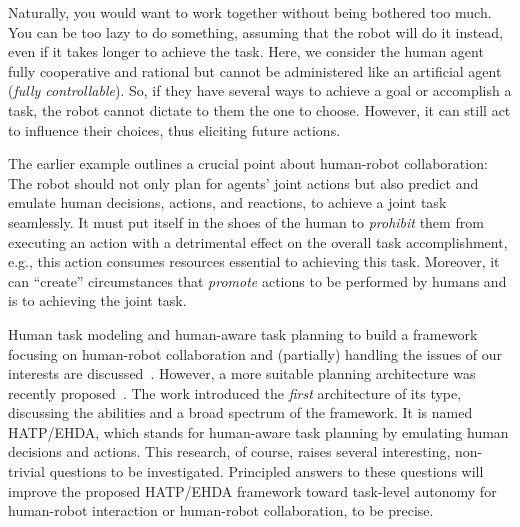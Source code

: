 \documentclass[letterpaper]{article} %
\begin{document}
Naturally, you would want to work together without being bothered too much. You can be too lazy to do something, assuming that the robot will do it instead, even if it takes longer to achieve the task. Here, we consider the human agent fully cooperative and rational but cannot be administered like an artificial agent (\textit{fully controllable}). 
So, if they have several ways to achieve a goal or accomplish a task, the robot cannot dictate to them the one to choose. However, it can still act to influence their choices, thus eliciting future actions. 

The earlier example outlines a crucial point about human-robot collaboration: The robot should not only plan for agents' joint actions but also predict and emulate human decisions, actions, and reactions, to achieve a joint task seamlessly. It must put itself in the shoes of the human to \textit{prohibit} them from executing an action with a detrimental effect on the overall task accomplishment, e.g., this action consumes resources essential to achieving this task. Moreover, it can ``create'' circumstances that \textit{promote} actions to be performed by humans and is  to achieving the joint task.                 


Human task modeling and human-aware task planning to build a framework focusing on human-robot collaboration and (partially) handling the issues of our interests are discussed~\cite{alami2006toward,montreuil2007planning,alili2009planning,alili2009task,lallement2014hatp,de2015hatp,lallement2018hatp}.
However, a more suitable planning architecture was recently proposed~\cite{BuisanA21,buisan:hal-03684211}.
The work introduced the \textit{first} architecture of its type, discussing the abilities and a broad spectrum of the framework.
It is named HATP/EHDA, which stands for human-aware task planning by emulating human decisions and actions. This research, of course, raises several interesting, non-trivial questions to be investigated. Principled answers to these questions will improve the proposed HATP/EHDA framework toward task-level autonomy for human-robot interaction or human-robot collaboration, to be precise. 
\end{document}
